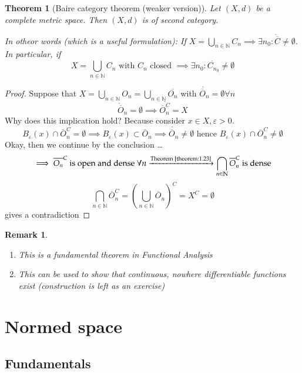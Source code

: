 \documentclass[a4paper]{article}
\newcounter{lecref}[section]
\numberwithin{lecref}{section}
\newtheorem{theorem}[lecref]{Theorem}
\newtheorem*{Remark}{Remark}
\begin{document}
\begin{theorem}[Baire category theorem (weaker version)]
	Let $(X, d)$ be a complete metric space. Then $(X, d)$ is of second category.

	In otheor words (which is a useful formulation):
	If $X = \bigcup_{n \in \mathbb N} C_n \implies \exists n_0: \mathring{\overline C} \neq \emptyset$.
	In particular, if
	\[ X = \bigcup_{n \in \mathbb N} C_n \text{ with } C_n \text{ closed } \implies \exists n_0: \mathring{C_{n_0}} \neq \emptyset \]
\end{theorem}

\begin{proof}
	Suppose that $X = \bigcup_{n \in \mathbb N} O_n = \bigcup_{n \in \mathbb N} \overline{O_n}$ with $\mathring{\overline O_n} = \emptyset \forall n$
	\[ \mathring{\overline O}_n = \emptyset \implies \overline{\overline{O}_n^C} = X \]
	Why does this implication hold? Because consider $x \in X, \varepsilon > 0$.
	\[ B_\varepsilon(x) \cap \overline O_n^C = \emptyset \implies B_{\varepsilon}(x) \subset \overline{O}_n \implies \mathring{\overline O_n} \neq \emptyset \text{ hence } B_\varepsilon(x) \cap {\overline O}_n^C \neq \emptyset \]
	Okay, then we continue by the conclusion \dots
	\[ \implies \overline{O_n}^C \text{ is open and dense } \forall n \xrightarrow{\text{Theorem~\ref{theorem:1.23}}} \bigcap_{n \in \mathbb N} \overline{O}_n^C \text{ is dense} \]
	\[ \bigcap_{n \in \mathbb N} \overline{O}_n^C = \left(\bigcup_{n \in \mathbb N} \overline{O}_n\right)^C = X^C = \emptyset \]
	gives a contradiction
\end{proof}

\begin{Remark}
	\begin{enumerate}
		\item This is a fundamental theorem in Functional Analysis
		\item This can be used to show that continuous, nowhere differentiable functions exist (construction is left as an exercise)
	\end{enumerate}
\end{Remark}

\section{Normed space}
\label{section:2}
\subsection{Fundamentals}
\label{section:2.1}
\end{document}
